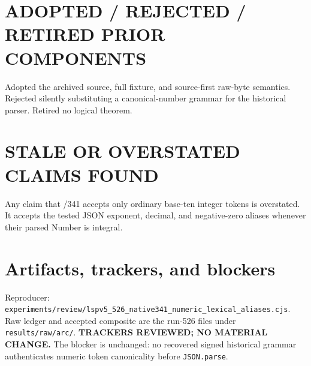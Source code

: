 \documentclass[11pt]{article}
\begin{document}
\section{ADOPTED / REJECTED / RETIRED PRIOR COMPONENTS}
Adopted the archived source, full fixture, and source-first raw-byte semantics. Rejected silently
substituting a canonical-number grammar for the historical parser. Retired no logical theorem.

\section{STALE OR OVERSTATED CLAIMS FOUND}
Any claim that /341 accepts only ordinary base-ten integer tokens is overstated. It accepts the
tested JSON exponent, decimal, and negative-zero aliases whenever their parsed Number is integral.

\section{Artifacts, trackers, and blockers}
Reproducer: \texttt{experiments/review/lspv5\_526\_native341\_numeric\_lexical\_aliases.cjs}.
Raw ledger and accepted composite are the run-526 files under \texttt{results/raw/arc/}.
\textbf{TRACKERS REVIEWED; NO MATERIAL CHANGE.} The blocker is unchanged: no recovered signed
historical grammar authenticates numeric token canonicality before \texttt{JSON.parse}.

\end{document}
